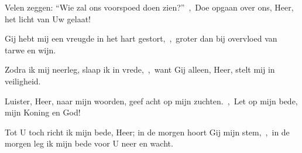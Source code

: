 \documentclass[12pt,twoside,a5paper]{article}
\begin{document}

\begin{halfparskip}
  Velen zeggen: ``Wie zal ons voorspoed doen zien?''~\sep\ Doe opgaan over ons, Heer, het licht van Uw gelaat!

  Gij hebt mij een vreugde in het hart gestort,~\sep\ groter dan bij overvloed van tarwe en wijn.

  Zodra ik mij neerleg, slaap ik in vrede,~\sep\ want Gij alleen, Heer, stelt mij in veiligheid.
\end{halfparskip}





\begin{halfparskip}
  Luister, Heer, naar mijn woorden, geef acht op mijn zuchten.~\sep\ Let op mijn bede, mijn Koning en God!


  Tot U toch richt ik mijn bede, Heer; in de morgen hoort Gij mijn stem,~\sep\ in de morgen leg ik mijn bede voor U neer en wacht.
\end{halfparskip}

\end{document}
